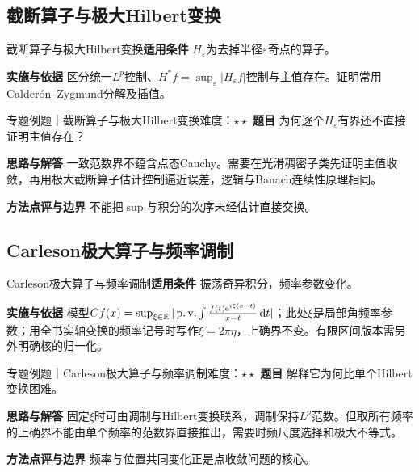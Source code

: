 \subsection{截断算子与极大Hilbert变换}\label{mat:fourier_advanced:hilbertLp}
\begin{method}{截断算子与极大Hilbert变换}\textbf{适用条件} $H_\varepsilon$为去掉半径$\varepsilon$奇点的算子。\par\textbf{实施与依据} 区分统一$L^p$控制、$H^*f=\sup_\varepsilon|H_\varepsilon f|$控制与主值存在。证明常用Calderón--Zygmund分解及插值。\end{method}
\begin{example}{专题例题｜截断算子与极大Hilbert变换}{难度：$\star\star$}
\textbf{题目} 为何逐个$H_\varepsilon$有界还不直接证明主值存在？\par\textbf{思路与解答} 一致范数界不蕴含点态Cauchy。需要在光滑稠密子类先证明主值收敛，再用极大截断算子估计控制逼近误差，逻辑与Banach连续性原理相同。\par\textbf{方法点评与边界} 不能把$\sup$与积分的次序未经估计直接交换。
\end{example}
\subsection{Carleson极大算子与频率调制}\label{mat:fourier_advanced:carleson}
\begin{method}{Carleson极大算子与频率调制}\textbf{适用条件} 振荡奇异积分，频率参数变化。\par\textbf{实施与依据} 模型$Cf(x)=\sup_{\xi\in\mathbb{R}}|\operatorname{p.v.}\int \frac{f(t)\mathrm{e}^{i\xi(x-t)}}{x-t}\mathop{}\!\mathrm{d} t|$；此处$\xi$是局部角频率参数；用全书实轴变换的频率记号时写作$\xi=2\pi\eta$，上确界不变。有限区间版本需另外明确核的归一化。\end{method}
\begin{example}{专题例题｜Carleson极大算子与频率调制}{难度：$\star\star$}
\textbf{题目} 解释它为何比单个Hilbert变换困难。\par\textbf{思路与解答} 固定$\xi$时可由调制与Hilbert变换联系，调制保持$L^p$范数。但取所有频率的上确界不能由单个频率的范数界直接推出，需要时频尺度选择和极大不等式。\par\textbf{方法点评与边界} 频率与位置共同变化正是点收敛问题的核心。
\end{example}
